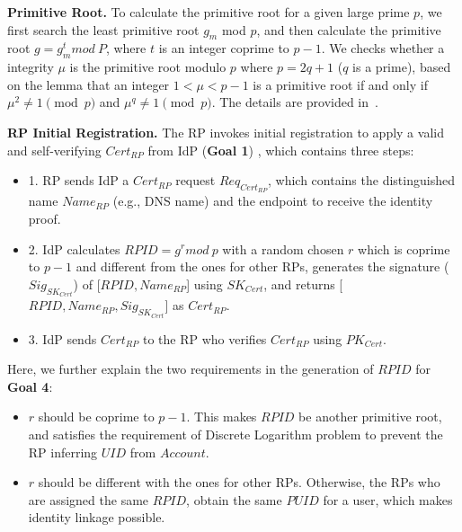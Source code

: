 \noindent\textbf{Primitive Root.} To calculate the primitive root for a given large prime $p$,  we first search the least primitive root $g_m$  mod $p$, and then calculate the primitive root $g = g_{m}^{t} mod \ P$, where $t$ is an integer coprime to $p-1$.
We checks whether a integrity $\mu$ is the primitive root modulo $p$ where $p=2q+1$ ($q$ is a prime), based on the lemma that an integer $1<\mu <p-1$ is a primitive root if and only if $\mu^2\neq 1 \pmod p$ and $\mu^q\neq 1 \pmod p$.
The details are provided in~\cite{Shoup,Wang}.


\noindent\textbf{RP Initial Registration.} The RP invokes initial registration to apply a valid and self-verifying $Cert_{RP}$ from IdP (\textbf{Goal 1})
, which contains three steps:

\begin{itemize}
\item 1. RP sends IdP a $Cert_{RP}$ request $Req_{Cert_{RP}}$, which contains the distinguished name $Name_{RP}$ (e.g., DNS name) and the endpoint to receive the identity proof.
\item 2. IdP calculates $RPID = g^r mod \ p$ with a random chosen $r$ which is coprime to $p-1$ and different from the ones for other RPs,  generates the signature ($Sig_{SK_{Cert}}$) of [$RPID, Name_{RP}$] using $SK_{Cert}$, and returns [$RPID, Name_{RP}, Sig_{SK_{Cert}}$] as $Cert_{RP}$.
\item 3. IdP sends $Cert_{RP}$ to the RP who verifies $Cert_{RP}$ using $PK_{Cert}$.
\end{itemize}


Here, we further explain the two requirements in the generation of $RPID$ for \textbf{Goal 4}:
\begin{itemize}
  \item $r$ should be coprime to $p-1$. This makes $RPID$ be another primitive root, and satisfies the requirement of Discrete Logarithm problem to prevent the RP inferring $UID$ from $Account$.
  \item $r$ should be different with the ones for other RPs. Otherwise, the RPs who are assigned the same $RPID$, obtain the same $PUID$ for a user, which makes identity linkage possible.
\end{itemize}

